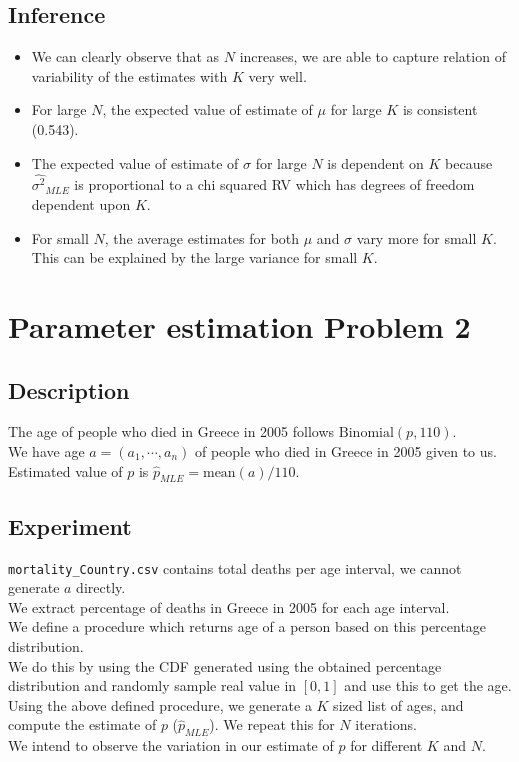 \documentclass[fleqn, 11pt]{article}
\begin{document}
\subsection{Inference}
\begin{itemize}
    \item We can clearly observe that as $N$ increases, we are able to capture relation of variability of the estimates with $K$ very well.
    \item For large $N$, the expected value of estimate of $\mu$ for large $K$ is consistent (0.543).
    \item The expected value of estimate of $\sigma$ for large $N$ is dependent on $K$ because $\hat{\sigma^2}_{MLE}$ is proportional to a chi squared RV which has degrees of freedom dependent upon $K$.
    \item For small $N$, the average estimates for both $\mu$ and $\sigma$ vary more for small $K$. \\
          This can be explained by the large variance for small $K$.
\end{itemize}


\newpage
\section{Parameter estimation Problem 2}
\setcounter{figure}{0}
\subsection{Description}
The age of people who died in Greece in 2005 follows $\mathrm{Binomial}(p, 110)$. \\
We have age $a = (a_1, \cdots ,a_n)$ of people who died in Greece in 2005 given to us. \\
Estimated value of $p$ is $\hat{p}_{MLE} = \mathrm{mean}(a) / 110$.

\subsection{Experiment}
\verb!mortality_Country.csv! contains total deaths per age interval, we cannot generate $a$ directly. \\
We extract percentage of deaths in Greece in 2005 for each age interval. \\
We define a procedure which returns age of a person based on this percentage distribution. \\
We do this by using the CDF generated using the obtained percentage distribution and randomly sample real value in $[0, 1]$ and use this to get the age. \\
Using the above defined procedure, we generate a $K$ sized list of ages, and compute the estimate of $p$ ($\hat{p}_{MLE}$). We repeat this for $N$ iterations. \\
We intend to observe the variation in our estimate of $p$ for different $K$ and $N$.
\end{document}
